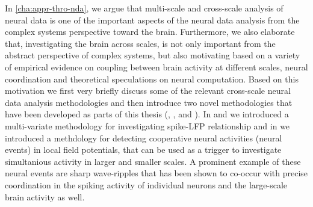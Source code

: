In \autoref{cha:appr-thro-nda}, we argue that multi-scale and cross-scale analysis of neural data is one of the important aspects of the neural data analysis from the complex systems perspective toward the brain.
Furthermore, we also elaborate that,
investigating the brain across scales, is not only important from the abstract perspective of complex systems,
but also motivating based on a variety of empirical evidence on coupling between brain activity at different scales, neural coordination and theoretical speculations on neural computation.
Based on this motivation we first very briefly discuss some of the relevant cross-scale neural data 
analysis methodologies and then introduce two novel methodologies that have been developed as parts of this thesis
(, , and ).
In  and  we introduced a multi-variate methodology for investigating spike-LFP relationship and in  we introduced a methdology for detecting cooperative neural activities (neural events) in local field potentials,
that can be used as a trigger to investigate simultanious activity in larger and smaller scales.
A prominent example of these neural events are sharp wave-ripples that has been shown to co-occur with precise coordination in the spiking activity of individual neurons and the large-scale brain activity as well.


